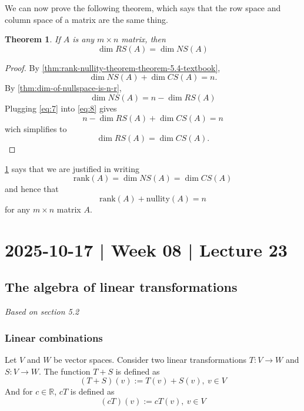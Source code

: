 \documentclass[10pt]{article}
\newtheorem{theorem}{Theorem}
\theoremstyle{definition}
\newcommand{\R}{\mathbb{R}}           %
\newcommand{\rank}{\mathrm{rank}} %
\begin{document}
We can now prove the following theorem, which says that the row space and
column space of a matrix are the same thing.
\begin{theorem}
  \label{thm:rowspace-columnspace-same-dimension}
  If $A$ is any $m\times n$ matrix, then
  \begin{equation*}
    \dim RS(A) = \dim NS(A)
  \end{equation*}
\end{theorem}
\begin{proof}
  By \cref{thm:rank-nullity-theorem-theorem-5.4-textbook},
 \begin{equation}\label{eq:8}
   \dim NS(A) + \dim CS(A)=n.
 \end{equation}
 By \cref{thm:dim-of-nullspace-is-n-r},
 \begin{equation}\label{eq:7}
   \dim NS(A) = n- \dim RS(A)
 \end{equation}
 Plugging \cref{eq:7} into \cref{eq:8} gives
 \begin{equation*}
   n-\dim RS(A)+ \dim CS(A)=n
 \end{equation*}
 wich simplifies to
 \begin{equation*}
   \dim RS(A)=\dim CS(A).
 \end{equation*}
\end{proof}

\cref{thm:rowspace-columnspace-same-dimension} says that we are justified in
writing
\begin{equation*}
  \rank(A) = \dim NS(A) = \dim CS(A)
\end{equation*}
and hence that
\begin{equation*}
  \rank(A) + \mathrm{nullity}(A)=n
\end{equation*}
for any $m\times n$ matrix $A$.

\newpage
\section{2025-10-17 | Week 08 | Lecture 23}
\subsection{The algebra of linear transformations}
\textit{Based on section 5.2}

\subsubsection{Linear combinations}
Let $V$ and $W$ be vector spaces. Consider two linear transformations $T:V \to
W$ and $S:V \to W$. The function $T+S$ is defined as
\begin{equation*}
  (T+S)(v) := T(v)+S(v), \ v\in V
\end{equation*}
And for $c\in \R$, $cT$ is defined as
\begin{equation*}
  (cT)(v):=cT(v),\ v\in V
\end{equation*}
\end{document}
